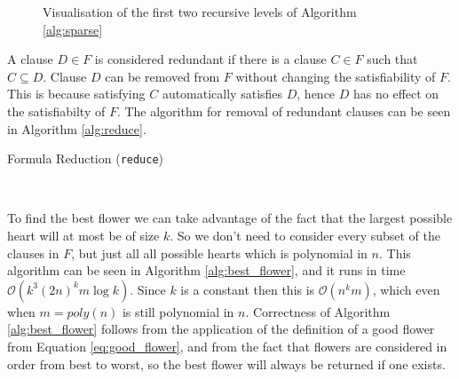 \begin{figure}
    \centering
    \caption{Visualisation of the first two recursive levels of Algorithm \ref{alg:sparse}}
    \label{fig:tree}
\end{figure}

A clause $D \in F$ is considered redundant if there is a clause $C \in F$ such that $C \subseteq D$.
Clause $D$ can be removed from $F$ without changing the satisfiability of $F$. This is because
satisfying $C$ automatically satisfies $D$, hence $D$ has no effect on the satisfiabilty of $F$.
The algorithm for removal of redundant clauses can be seen in Algorithm \ref{alg:reduce}.

\begin{algorithm}
\caption{Formula Reduction (\texttt{reduce})}
\label{alg:reduce}
\vspace{5pt}
\hrulefill\\

\nl {}
\nl {}
\end{algorithm}

To find the best flower we can take advantage of the fact that the largest possible heart will
at most be of size $k$. So we don't need to consider every subset of the clauses in $F$, but
just all all possible hearts which is polynomial in $n$. This algorithm can be seen in Algorithm \ref{alg:best_flower}, and
it runs in time $\mathcal{O}(k^3(2n)^{k}m\log k)$. Since $k$ is a constant then this is $\mathcal{O}(n^{k}m)$, which even when
$m = poly(n)$ is still polynomial in $n$. Correctness of Algorithm \ref{alg:best_flower} follows from the application of the
definition of a good flower from Equation \ref{eq:good_flower}, and from the fact that flowers are considered in
order from best to worst, so the best flower will always be returned if one exists.

